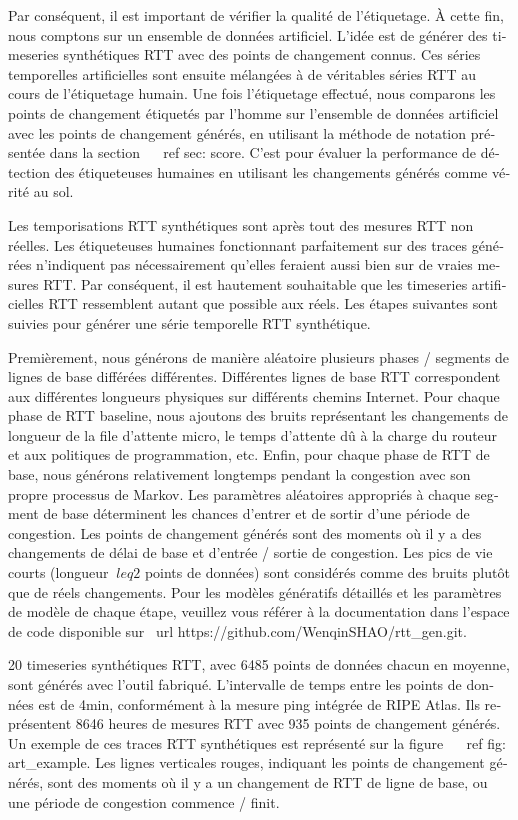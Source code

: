 \begin{otherlanguage}{french}
{Par conséquent, il est important de vérifier la qualité de l'étiquetage.
À cette fin, nous comptons sur un ensemble de données artificiel.
L'idée est de générer des timeseries synthétiques RTT avec des points de changement connus.
Ces séries temporelles artificielles sont ensuite mélangées à de véritables séries RTT au cours de l'étiquetage humain.
Une fois l'étiquetage effectué, nous comparons les points de changement étiquetés par l'homme sur l'ensemble de données artificiel avec les points de changement générés, en utilisant la méthode de notation présentée dans la section ~ \ ref {sec: score}.
C'est pour évaluer la performance de détection des étiqueteuses humaines en utilisant les changements générés comme vérité au sol.

Les temporisations RTT synthétiques sont après tout des mesures RTT non réelles.
Les étiqueteuses humaines fonctionnant parfaitement sur des traces générées n'indiquent pas nécessairement qu'elles feraient aussi bien sur de vraies mesures RTT.
Par conséquent, il est hautement souhaitable que les timeseries artificielles RTT ressemblent autant que possible aux réels.
Les étapes suivantes sont suivies pour générer une série temporelle RTT synthétique.

Premièrement, nous générons de manière aléatoire plusieurs phases / segments de lignes de base différées différentes.
Différentes lignes de base RTT correspondent aux différentes longueurs physiques sur différents chemins Internet.
Pour chaque phase de RTT baseline, nous ajoutons des bruits représentant les changements de longueur de la file d'attente micro, le temps d'attente dû à la charge du routeur et aux politiques de programmation, etc.
Enfin, pour chaque phase de RTT de base, nous générons relativement longtemps pendant la congestion avec son propre processus de Markov.
Les paramètres aléatoires appropriés à chaque segment de base déterminent les chances d'entrer et de sortir d'une période de congestion.
Les points de changement générés sont des moments où il y a des changements de délai de base et d'entrée / sortie de congestion.
Les pics de vie courts (longueur $ \ leq 2 $ points de données) sont considérés comme des bruits plutôt que de réels changements.
Pour les modèles génératifs détaillés et les paramètres de modèle de chaque étape, veuillez vous référer à la documentation dans l'espace de code disponible sur \ url {https://github.com/WenqinSHAO/rtt_gen.git}.

20 timeseries synthétiques RTT, avec 6485 points de données chacun en moyenne, sont générés avec l'outil fabriqué.
L'intervalle de temps entre les points de données est de 4min, conformément à la mesure ping intégrée de RIPE Atlas.
Ils représentent 8646 heures de mesures RTT avec 935 points de changement générés.
Un exemple de ces traces RTT synthétiques est représenté sur la figure ~ \ ref {fig: art_example}.
Les lignes verticales rouges, indiquant les points de changement générés, sont des moments où il y a un changement de RTT de ligne de base, ou une période de congestion commence / finit.

}
\end{otherlanguage}
